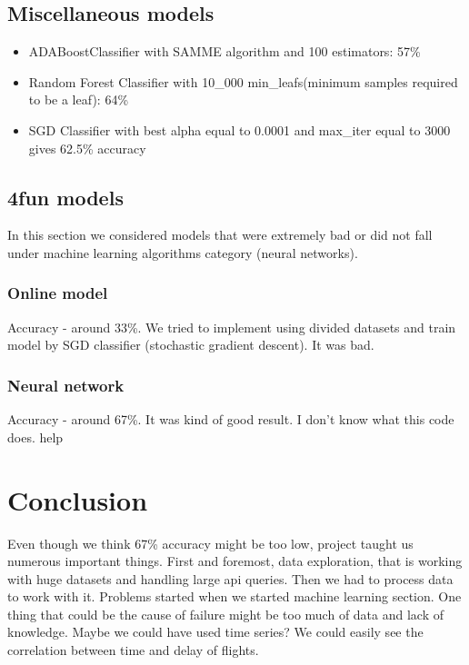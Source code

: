 \documentclass{article}
\begin{document}
\subsection{Miscellaneous models}
	\begin{itemize}
	\item ADABoostClassifier with SAMME algorithm and 100 estimators: 57\%
	\item Random Forest Classifier with 10\_000 min\_leafs(minimum samples required to be a leaf): 64\%
	\item SGD Classifier with best alpha equal to 0.0001 and max\_iter equal to 3000 gives 62.5\% accuracy
	\end{itemize}

\subsection{4fun models}
In this section we considered models that were extremely bad or did not fall under machine learning algorithms category (neural networks).

\subsubsection{Online model}
Accuracy - around 33\%. We tried to implement using divided datasets and train model by SGD classifier (stochastic gradient descent).
It was bad.

\subsubsection{Neural network}
Accuracy - around 67\%. It was kind of good result.  I don't know what this code does. help


\section{Conclusion}
Even though we think 67\% accuracy might be too low, project taught us numerous important things. First and foremost, data exploration, that is
working with huge datasets and handling large api queries.  Then we had to process data to work with it. Problems started when we started machine learning
section. One thing that could be the cause of failure might be too much of data and lack of knowledge. Maybe we could have used time series? We
could easily see the correlation between time and delay of flights.
\end{document}
